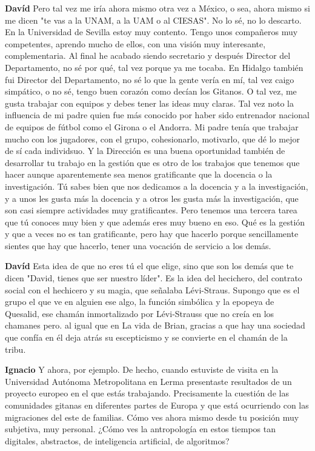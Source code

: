 \documentclass[
  spanish,
  11pt,
  a4paper,
]{scrbook}
\newenvironment{transcripcion}{
    \begin{list}{}{
        \setlength{\leftmargin}{1.5em}  %
        \setlength{\rightmargin}{0em}
        \setlength{\itemsep}{0.2em}     %
        \setlength{\parsep}{0.0em}
        \setlength{\listparindent}{0pt}
    }
}{
    \end{list}
}
\newcommand{\personaje}[1]{\textbf{#1}\quad}
\begin{document}
\begin{transcripcion}
\item \personaje{Davíd} Pero tal vez me iría ahora mismo otra vez a México, o sea, ahora mismo si me dicen "te vas a la UNAM, a la UAM o al CIESAS". No lo sé, no lo descarto. En la Universidad de Sevilla estoy muy contento. Tengo unos compañeros muy competentes, aprendo mucho de ellos, con una visión muy interesante, complementaria. Al final he acabado siendo secretario y después Director del Departamento, no sé por qué, tal vez porque ya me tocaba. En Hidalgo también fui Director del Departamento, no sé lo que la gente vería en mí, tal vez caigo simpático, o no sé, tengo buen corazón como decían los Gitanos. O tal vez, me gusta trabajar con equipos y debes tener las ideas muy claras. Tal vez noto la influencia de mi padre quien fue más conocido por haber sido entrenador nacional de equipos de fútbol como el Girona o el Andorra. Mi padre tenía que trabajar mucho con los jugadores, con el grupo, cohesionarlo, motivarlo, que dé lo mejor de sí cada individsuo. Y la Dirección es una buena oportunidad también de desarrollar tu trabajo en la gestión que es otro de los trabajos que tenemos que hacer aunque aparentemente sea menos gratificante que la docencia o la investigación. Tú sabes bien que nos dedicamos a la docencia y a la investigación, y a unos les gusta más la docencia y a otros les gusta más la investigación, que son casi siempre actividades muy gratificantes. Pero tenemos una tercera tarea que tú conoces muy bien y que además eres muy bueno en eso. Qué es la gestión y que a veces no es tan gratificante, pero hay que hacerlo porque sencillamente sientes que hay que hacerlo, tener una vocación de servicio a los demás.

\item \personaje{Davíd} Esta idea de que no eres tú el que elige, sino que son los demás que te dicen "David, tienes que ser nuestro líder". Es la idea del hecichero, del contrato social con el hechicero y su magia, que señalaba Lévi-Straus. Supongo que es el grupo el que ve en alguien ese algo, la función simbólica y la epopeya de Quesalid, ese chamán inmortalizado por Lévi-Strauss que no creía en los chamanes pero. al igual que en La vida de Brian, gracias a que hay una sociedad que confía en él deja atrás su escepticismo y se convierte en el chamán de la tribu.

\item \personaje{Ignacio} Y ahora, por ejemplo. De hecho, cuando estuviste de visita en la Universidad Autónoma Metropolitana en Lerma presentaste resultados de un proyecto europeo en el que estás trabajando. Precisamente la cuestión de las comunidades gitanas en diferentes partes de Europa y que está ocurriendo con las migraciones del este de familias. Cómo ves ahora mismo desde tu posición muy subjetiva, muy personal. ¿Cómo ves la antropología en estos tiempos tan digitales, abstractos, de inteligencia artificial, de algoritmos?


\end{transcripcion}
\end{document}
